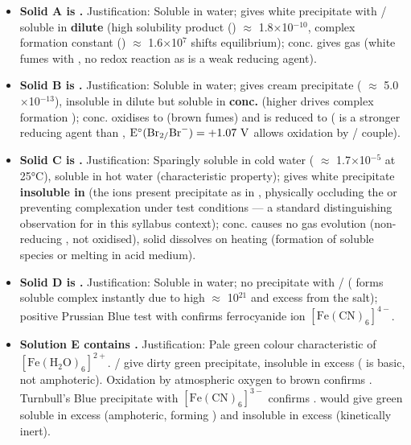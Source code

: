 \documentclass[11pt]{article}
\begin{document}
\begin{aretenir}
\begin{itemize}
    \item \textbf{Solid A is .} Justification: Soluble in water; gives white  precipitate with / soluble in \textbf{dilute}  (high solubility product () $\approx$ 1.8$\times$10$^{-10}$, complex formation constant (\ce{[Ag(NH3)2]+}) $\approx$ 1.6$\times$10$^{7}$ shifts equilibrium); conc.  gives  gas (white fumes with , no redox reaction as  is a weak reducing agent).
    \item \textbf{Solid B is .} Justification: Soluble in water; gives cream  precipitate ( $\approx$ 5.0$\times$10$^{-13}$), insoluble in dilute  but soluble in \textbf{conc.}  (higher \ce{[NH3]} drives complex formation ); conc.  oxidises  to  (brown fumes) and is reduced to  ( is a stronger reducing agent than , \ensuremath{\mathrm{E^\circ(\ce{Br2/Br^{-}})=+1.07\ V}} allows oxidation by / couple).
    \item \textbf{Solid C is .} Justification: Sparingly soluble in cold water ( $\approx$ 1.7$\times$10$^{-5}$ at 25°C), soluble in hot water (characteristic property); gives white  precipitate \textbf{insoluble in } (the  ions present precipitate as  in , physically occluding the  or preventing complexation under test conditions — a standard distinguishing observation for  in this syllabus context); conc.  causes no gas evolution (non-reducing ,  not oxidised), solid dissolves on heating (formation of soluble species or melting in acid medium).
    \item \textbf{Solid D is .} Justification: Soluble in water; no precipitate with / ( forms soluble \ce{[Ag(CN)2]-} complex instantly due to high  $\approx$ 10$^{21}$ and excess  from the salt); positive Prussian Blue test with  confirms ferrocyanide ion \ensuremath{\mathrm{[Fe(CN)_{6}]^{4-}}}.
    \item \textbf{Solution E contains .} Justification: Pale green colour characteristic of \ensuremath{\mathrm{[Fe(H_{2}O)_{6}]^{2+}}}. / give dirty green  precipitate, insoluble in excess ( is basic, not amphoteric). Oxidation by atmospheric oxygen to brown  confirms . Turnbull's Blue precipitate with \ensuremath{\mathrm{[Fe(CN)_{6}]^{3-}}} confirms .  would give green  soluble in excess  (amphoteric, forming \ce{[Cr(OH)4]-}) and insoluble in excess  (kinetically inert).
\end{itemize}
\end{aretenir}
\end{document}
